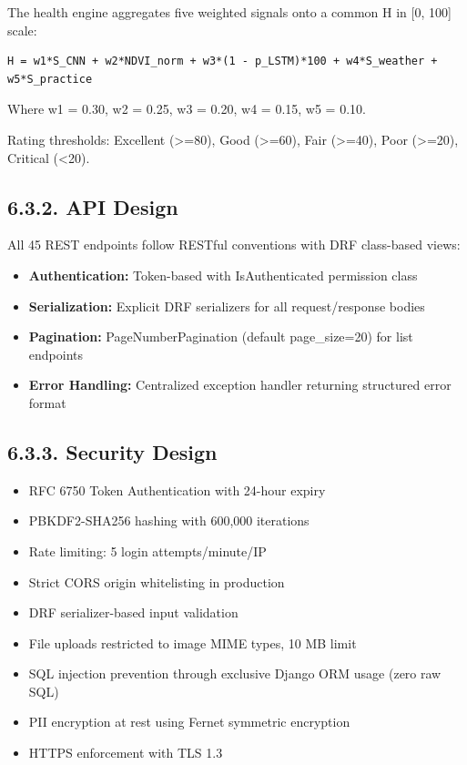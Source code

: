 \documentclass[12pt, a4paper]{report}
\begin{document}
The health engine aggregates five weighted signals onto a common H in [0, 100] scale:

\begin{Verbatim}[fontsize=\small]
H = w1*S_CNN + w2*NDVI_norm + w3*(1 - p_LSTM)*100 + w4*S_weather + w5*S_practice
\end{Verbatim}
Where w1 = 0.30, w2 = 0.25, w3 = 0.20, w4 = 0.15, w5 = 0.10.

Rating thresholds: Excellent (>=80), Good (>=60), Fair (>=40), Poor (>=20), Critical (<20).

\subsection{6.3.2. API Design}
All 45 REST endpoints follow RESTful conventions with DRF class-based views:

\begin{itemize}[leftmargin=*]
  \item \textbf{Authentication:} Token-based with IsAuthenticated permission class
  \item \textbf{Serialization:} Explicit DRF serializers for all request/response bodies
  \item \textbf{Pagination:} PageNumberPagination (default page\_size=20) for list endpoints
  \item \textbf{Error Handling:} Centralized exception handler returning structured error format
\end{itemize}
\subsection{6.3.3. Security Design}
\begin{itemize}[leftmargin=*]
  \item RFC 6750 Token Authentication with 24-hour expiry
  \item PBKDF2-SHA256 hashing with 600,000 iterations
  \item Rate limiting: 5 login attempts/minute/IP
  \item Strict CORS origin whitelisting in production
  \item DRF serializer-based input validation
  \item File uploads restricted to image MIME types, 10 MB limit
  \item SQL injection prevention through exclusive Django ORM usage (zero raw SQL)
  \item PII encryption at rest using Fernet symmetric encryption
  \item HTTPS enforcement with TLS 1.3
\end{itemize}
\end{document}
